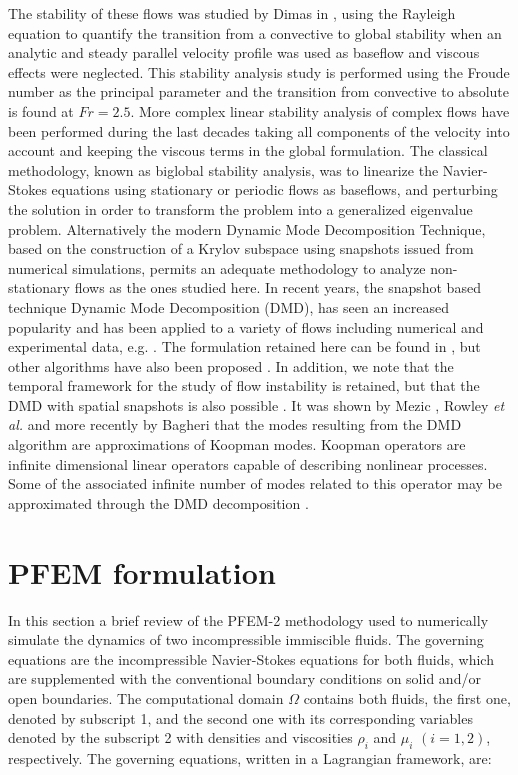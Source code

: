 \documentclass[a4paper,conference]{IEEEtran}
\begin{document}
The stability of these flows was studied by Dimas in \cite{Dimas89}, using the Rayleigh equation to quantify the transition from a convective to global stability when an analytic and steady parallel velocity profile was used as baseflow and viscous effects were neglected. This stability analysis study is performed using the Froude number as the principal parameter and the transition from convective to absolute is found at $Fr=2.5$. More complex linear stability analysis of complex flows have been performed during the last decades taking all components of the velocity into account and keeping the viscous terms in the global formulation. The classical methodology, known as biglobal stability analysis, was to linearize the Navier-Stokes equations using stationary or periodic flows as baseflows, and perturbing the solution in order to transform the problem into a generalized eigenvalue problem. Alternatively the modern Dynamic Mode Decomposition Technique, based on the construction of a Krylov subspace using snapshots issued from numerical simulations, permits an adequate methodology to analyze non-stationary flows as the ones studied here. In recent years, the snapshot based technique Dynamic Mode Decomposition (DMD), has seen an increased popularity \cite{DMDSchmid,princeton} and has been applied to a variety of flows including numerical and experimental data, e.g. \cite{Bagheri_Cyl,Mezic_koopman,Rowley_JFM,Soria_DMD}. The formulation retained here can be found in \cite{DMDSchmid}, but other algorithms have also been proposed \cite{princeton,SparsityDMD}. In addition, we note that the temporal framework for the study of flow instability is retained, but that the DMD with spatial snapshots is also possible \cite{DMDSchmid}. It was shown by Mezic \cite{Mezic_koopman}, Rowley \textit{et al.} \cite{Rowley_JFM} and more recently by Bagheri \cite{Bagheri_Cyl} that the modes resulting from the DMD algorithm are approximations of Koopman modes. Koopman operators are infinite dimensional linear operators capable of describing nonlinear processes. Some of the associated infinite number of modes related to this operator may be approximated through the DMD decomposition \cite{Mezic_koopman}.

\section{PFEM formulation}\label{GeneralFor}

In this section a brief review of the PFEM-2 methodology used to numerically simulate the dynamics of two incompressible immiscible fluids. The governing equations are the incompressible Navier-Stokes equations for both fluids, which are supplemented with the conventional boundary conditions on solid and/or open boundaries. The computational domain $\Omega$ contains both fluids, the first one, denoted by subscript 1, and the second one with its corresponding variables denoted by the subscript 2 with densities and viscosities $\rho_i$ and $\mu_i$ $(i=1,2)$, respectively. The governing equations, written in a Lagrangian framework, are:
\end{document}

